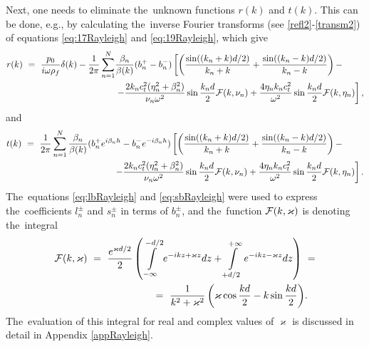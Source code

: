 Next, one needs to eliminate the~unknown functions $r(k)$ and $t(k)$.
This can be done, e.g., by calculating the~inverse Fourier transforms (see \cref{refl2}-\cref{transm2}) of equations \cref{eq:17Rayleigh} and \cref{eq:19Rayleigh}, which give
\begin{align}
r(k)~=~\frac{p_0}{i\omega\rho_f}\delta(k)-\frac{1}{2\pi}\sum\limits_{n=1}^{N}&\frac{\beta_n}{\beta(k)}({b_n^+}-{b_n^-})\left[
\left(\frac{\sin((k_n+k)d/2)}{k_n+k}+\frac{\sin((k_n-k)d/2)}{k_n-k}\right)- \right. \label{eq:B5Rayleigh} \\
&\left. -\frac{2k_n c_t^2(\eta_n^2+\beta_n^2)}{\nu_n\omega^2}\sin\frac{k_nd}{2}{\mathcal F}(k, \nu_n)+ \frac{4\eta_n k_nc_t^2}{\omega^2}\sin\frac{k_nd}{2}{\mathcal F}(k, \eta_n) \right], \notag
\end{align}
and
\begin{align}
t(k)~=~\frac{1}{2\pi}\sum\limits_{n=1}^{N}\frac{\beta_n}{\beta(k)}&({b_n^+}e^{i\beta_nh}-{b_n^-}e^{-i\beta_nh})\left[
\left(\frac{\sin((k_n+k)d/2)}{k_n+k}+\frac{\sin((k_n-k)d/2)}{k_n-k}\right)- \right. \label{eq:B6Rayleigh}\\
&\hspace{1cm}\left. -\frac{2k_n c_t^2(\eta_n^2+\beta_n^2)}{\nu_n\omega^2}\sin\frac{k_nd}{2}{\mathcal F}(k, \nu_n)+ \frac{4\eta_n k_nc_t^2}{\omega^2}\sin\frac{k_nd}{2}{\mathcal F}(k, \eta_n) \right]. \notag
\end{align}
The~equations \cref{eq:lbRayleigh} and \cref{eq:sbRayleigh} were used to express the~coefficients $l_n^{\pm}$ and $s_n^{\pm}$ in terms of $b_n^{\pm}$, and the~function ${\mathcal F}(k, \varkappa)$ is denoting the~integral
\begin{align}
{\mathcal F}(k, \varkappa)~=~\frac{e^{\varkappa d/2}}{2}\left(\int\limits_{-\infty}^{-d/2}e^{-ikz+\varkappa z}dz + \int\limits_{+d/2}^{+\infty}e^{-ikz-\varkappa z}dz\right)~&= \\
=~\frac{1}{k^2+\varkappa^2}\left(\varkappa \cos\frac{kd}{2}-k\sin\frac{kd}{2}\right)&. \notag
\end{align}
The~evaluation of this integral for real and complex values of $\varkappa$ is discussed in detail in Appendix \ref{appRayleigh}.

